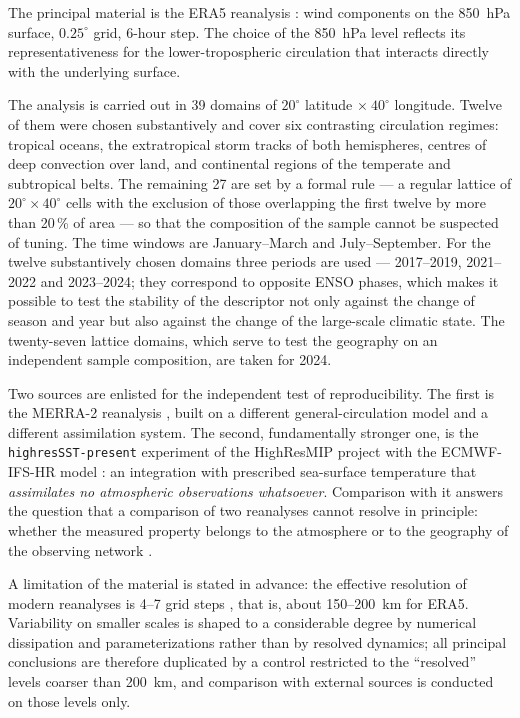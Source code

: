 \documentclass[11pt,a4paper]{article}
\begin{document}
The principal material is the ERA5 reanalysis \cite{Hersbach2020,Soci2024}: wind components on the 850~hPa surface, $0.25^\circ$ grid, 6-hour step. The choice of the 850~hPa level reflects its representativeness for the lower-tropospheric circulation that interacts directly with the underlying surface.

The analysis is carried out in 39 domains of $20^\circ$ latitude $\times\ 40^\circ$ longitude. Twelve of them were chosen substantively and cover six contrasting circulation regimes: tropical oceans, the extratropical storm tracks of both hemispheres, centres of deep convection over land, and continental regions of the temperate and subtropical belts. The remaining 27 are set by a formal rule --- a regular lattice of $20^\circ\times40^\circ$ cells with the exclusion of those overlapping the first twelve by more than 20\,\% of area --- so that the composition of the sample cannot be suspected of tuning. The time windows are January--March and July--September. For the twelve substantively chosen domains three periods are used --- 2017--2019, 2021--2022 and 2023--2024; they correspond to opposite ENSO phases, which makes it possible to test the stability of the descriptor not only against the change of season and year but also against the change of the large-scale climatic state. The twenty-seven lattice domains, which serve to test the geography on an independent sample composition, are taken for 2024.

Two sources are enlisted for the independent test of reproducibility. The first is the MERRA-2 reanalysis \cite{Gelaro2017}, built on a different general-circulation model and a different assimilation system. The second, fundamentally stronger one, is the \texttt{highresSST-present} experiment of the HighResMIP project \cite{Haarsma2016} with the ECMWF-IFS-HR model \cite{Roberts2018}: an integration with prescribed sea-surface temperature that \emph{assimilates no atmospheric observations whatsoever}. Comparison with it answers the question that a comparison of two reanalyses cannot resolve in principle: whether the measured property belongs to the atmosphere or to the geography of the observing network \cite{BonavitaLaloyaux2020}.

A limitation of the material is stated in advance: the effective resolution of modern reanalyses is 4--7 grid steps \cite{Skamarock2004,Bolgiani2022}, that is, about 150--200~km for ERA5. Variability on smaller scales is shaped to a considerable degree by numerical dissipation and parameterizations rather than by resolved dynamics; all principal conclusions are therefore duplicated by a control restricted to the ``resolved'' levels coarser than 200~km, and comparison with external sources is conducted on those levels only.
\end{document}
